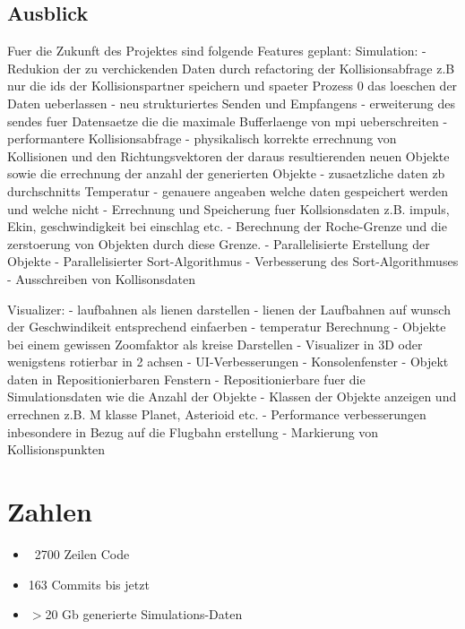 \subsection{Ausblick}
Fuer die Zukunft des Projektes sind folgende Features geplant:
    Simulation:
        - Redukion der zu verchickenden Daten durch refactoring der Kollisionsabfrage
          z.B nur die ids der Kollisionspartner speichern und spaeter Prozess 0 das loeschen
          der Daten ueberlassen
        - neu strukturiertes Senden und Empfangens
        - erweiterung des sendes fuer Datensaetze die die maximale
          Bufferlaenge von mpi ueberschreiten
        - performantere Kollisionsabfrage
        - physikalisch korrekte errechnung von Kollisionen und den
          Richtungsvektoren der daraus resultierenden neuen Objekte sowie
          die errechnung der anzahl der generierten Objekte
        - zusaetzliche daten zb durchschnitts Temperatur
        - genauere angeaben welche daten gespeichert werden und welche nicht
        - Errechnung und Speicherung fuer Kollsionsdaten z.B. impuls, Ekin,
          geschwindigkeit bei einschlag etc.
        - Berechnung der Roche-Grenze und die zerstoerung von Objekten 
          durch diese Grenze.
        - Parallelisierte Erstellung der Objekte
        - Parallelisierter Sort-Algorithmus
        - Verbesserung des Sort-Algorithmuses
        - Ausschreiben von Kollisonsdaten

    Visualizer:
        - laufbahnen als lienen darstellen
        - lienen der Laufbahnen auf wunsch der Geschwindikeit entsprechend
          einfaerben
        - temperatur Berechnung
        - Objekte bei einem gewissen Zoomfaktor als kreise Darstellen
        - Visualizer in 3D oder wenigstens rotierbar in 2 achsen
        - UI-Verbesserungen
        - Konsolenfenster
        - Objekt daten in Repositionierbaren Fenstern
        - Repositionierbare fuer die Simulationsdaten wie die Anzahl der Objekte
        - Klassen der Objekte anzeigen und errechnen z.B. M klasse Planet, Asterioid etc.
        - Performance verbesserungen inbesondere in Bezug auf die Flugbahn erstellung
        - Markierung von Kollisionspunkten

\section{Zahlen}
\begin{itemize}
    \item ~2700 Zeilen Code
    \item 163 Commits bis jetzt
    \item $>$20 Gb generierte Simulations-Daten
\end{itemize}

